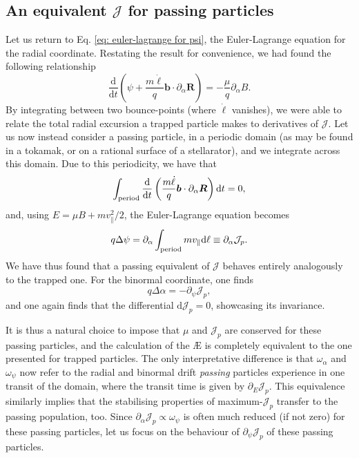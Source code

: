 \subsection*{An equivalent $\mathcal{J}$ for passing particles}
Let us return to Eq. \eqref{eq: euler-lagrange for psi}, the Euler-Lagrange equation for the radial coordinate. Restating the result for convenience, we had found the following relationship
\begin{equation}
    \frac{\mathrm{d}}{\mathrm{d}t}\left( \psi + \frac{m \dot{\ell}}{q} \boldsymbol{b} \cdot \partial_\alpha \boldsymbol{R} \right) = - \frac{\mu}{q} \partial_\alpha B.
\end{equation}
By integrating between two bounce-points (where $\dot{\ell}$ vanishes), we were able to relate the total radial excursion a trapped particle makes to derivatives of $\mathcal{J}$. Let us now instead consider a passing particle, in a periodic domain (as may be found in a tokamak, or on a rational surface of a stellarator), and we integrate across this domain. Due to this periodicity, we have that
\begin{equation}
    \int_{\rm period} \frac{\mathrm{d}}{\mathrm{d}t} \left( \frac{m \dot{\ell}}{q} \boldsymbol{b} \cdot \partial_\alpha \boldsymbol{R} \right) \mathrm{d} t = 0,
\end{equation}
and, using $E = \mu B + m v_\parallel^2/2$, the Euler-Lagrange equation becomes
\begin{equation}
    q\Delta \psi = \partial_\alpha \int_{\rm period} m v_\parallel \mathrm{d} \ell \equiv \partial_\alpha \mathcal{J}_{p}.
\end{equation}
We have thus found that a passing equivalent of $\mathcal{J}$ behaves entirely analogously to the trapped one. For the binormal coordinate, one finds
\begin{equation}
    q\Delta \alpha = - \partial_\psi \mathcal{J}_p,
\end{equation}
and one again finds that the differential $\mathrm{d}\mathcal{J}_p = 0$, showcasing its invariance. \par 
It is thus a natural choice to impose that $\mu$ and $\mathcal{J}_p$ are conserved for these passing particles, and the calculation of the \AE{} is completely equivalent to the one presented for trapped particles. The only interpretative difference is that $\omega_\alpha$ and $\omega_\psi$ now refer to the radial and binormal drift \textit{passing} particles experience in one transit of the domain, where the transit time is given by $\partial_E \mathcal{J}_p$. This equivalence similarly implies that the stabilising properties of maximum-$\mathcal{J}_p$ transfer to the passing population, too. Since $\partial_\alpha \mathcal{J}_p \propto \omega_\psi$ is often much reduced (if not zero) for these passing particles, let us focus on the behaviour of $\partial_\psi \mathcal{J}_p$ of these passing particles.

